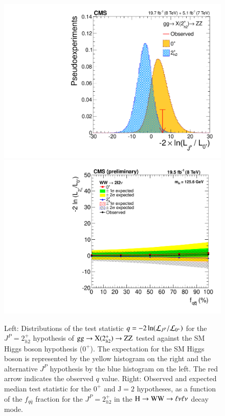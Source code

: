 \begin{figure}[!p]
\begin{center}
\centerline{
\includegraphics[width=0.45\linewidth]{figures/hzz_sigsep_combine_gg_2h2+.pdf}
\includegraphics[width=0.45\linewidth]{figures/hww_sigsep_combine_2h2+.pdf}
}
\caption{ Left: Distributions of the test statistic $q=-2\ln({\cal L}_{J^P}/{\cal L}_{0^+})$ 
       for the $J^P=2^+_{h2}$ hypothesis of $\mathrm{g}\mathrm{g}\to\mathrm{X}(2^+_{h2})\to \mathrm{Z}\mathrm{Z}$
      tested against the SM Higgs boson hypothesis ($0^+$). 
            The expectation for the SM Higgs boson is represented by the yellow histogram on the right and the alternative $J^P$ hypothesis by the
      blue histogram on the left. The red arrow indicates the observed $q$ value.  
      Right: Observed and expected median test statistic for the $0^+$ and $\mathrm{J}=2$ hypotheses, as a function of the $f_{q\bar{q}}$ fraction for
      the $J^P=2^+_{h2}$ in the $\mathrm{H}\to\mathrm{W}\mathrm{W}\to\ell\nu\ell\nu$ decay mode.
\label{fig:fig:jp_summary_2}}
\end{center}
\end{figure}


